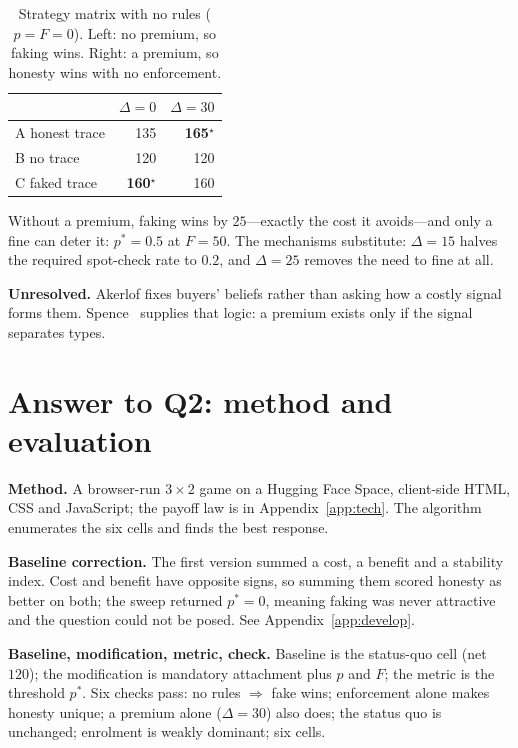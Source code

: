 \begin{table}[h]\caption{Strategy matrix with no rules ($p=F=0$). Left: no premium, so faking wins. Right: a premium, so honesty wins with no enforcement.}\label{tab:matrix}
\renewcommand{\arraystretch}{1.18}
\begin{tabular}{@{}lrr@{}}\toprule
 & \textbf{$\Delta=0$} & \textbf{$\Delta=30$} \\\midrule
A \quad honest trace & 135 & \textbf{165}$^{\star}$ \\
B \quad no trace     & 120 & 120 \\
C \quad faked trace  & \textbf{160}$^{\star}$ & 160 \\\bottomrule
\end{tabular}\end{table}

Without a premium, faking wins by $25$---exactly the cost it avoids---and only a fine can deter it: $p^{*}=0.5$ at $F=50$. The mechanisms substitute: $\Delta=15$ halves the required spot-check rate to $0.2$, and $\Delta=25$ removes the need to fine at all.

\textbf{Unresolved.} Akerlof fixes buyers' beliefs rather than asking how a costly signal forms them. Spence~\cite{spence1973} supplies that logic: a premium exists only if the signal separates types.

\section{Answer to Q2: method and evaluation}
\textbf{Method.} A browser-run $3\times2$ game on a Hugging Face Space, client-side HTML, CSS and JavaScript; the payoff law is in Appendix~\ref{app:tech}. The algorithm enumerates the six cells and finds the best response.

\textbf{Baseline correction.} The first version summed a cost, a benefit and a stability index. Cost and benefit have opposite signs, so summing them scored honesty as better on both; the sweep returned $p^{*}=0$, meaning faking was never attractive and the question could not be posed. See Appendix~\ref{app:develop}.

\textbf{Baseline, modification, metric, check.} Baseline is the status-quo cell (net $120$); the modification is mandatory attachment plus $p$ and $F$; the metric is the threshold $p^{*}$. Six checks pass: no rules $\Rightarrow$ fake wins; enforcement alone makes honesty unique; a premium alone ($\Delta=30$) also does; the status quo is unchanged; enrolment is weakly dominant; six cells.

